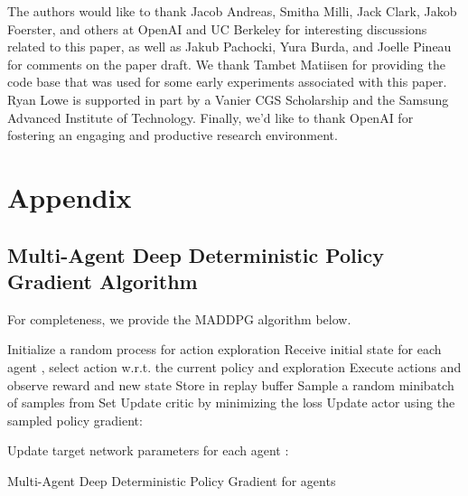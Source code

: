 \documentclass{article}
\begin{document}
The authors would like to thank Jacob Andreas, Smitha Milli, Jack Clark, Jakob Foerster, and others at OpenAI and UC Berkeley for interesting discussions related to this paper, as well as Jakub Pachocki, Yura Burda, and Joelle Pineau for comments on the paper draft. We thank Tambet Matiisen for providing the code base that was used for some early experiments associated with this paper. Ryan Lowe is supported in part by a Vanier CGS Scholarship and the Samsung Advanced Institute of Technology. Finally, we'd like to thank OpenAI for fostering an engaging and productive research environment. 




















\newpage

\section*{Appendix}
\label{sec:appendix}

\subsection*{Multi-Agent Deep Deterministic Policy Gradient Algorithm}
For completeness, we provide the MADDPG algorithm below.

\begin{algorithm}[H]
 \SetAlgoLined
  \begin{algorithmic}
    \FOR{}
      \STATE Initialize a random process  for action exploration
      \STATE Receive initial state 
      \FOR{}
          \STATE for each agent , select action  w.r.t. the current policy and exploration
          \STATE Execute actions  and observe reward  and new state 
          \STATE Store  in replay buffer 
          \STATE 
            \STATE Sample a random minibatch of  samples  from 
            \STATE Set 
            \STATE Update critic by minimizing the loss 
            \STATE Update actor using the sampled policy gradient:
            
          \ENDFOR     
          \STATE Update target network parameters for each agent :
          
      \ENDFOR
    \ENDFOR
  \end{algorithmic}
 \caption{Multi-Agent Deep Deterministic Policy Gradient for  agents}
\end{algorithm}
\end{document}
